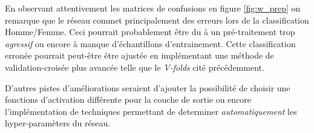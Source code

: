 \documentclass[11pt]{article}
\begin{document}
En observant attentivement les matrices de
confusions en figure \ref{fig:w_prep} on remarque que le r\'eseau commet
principalement des erreurs lors de la classification Homme/Femme. Ceci pourrait
probablement \^etre du \`a un pr\'e-traitement trop {\em agressif} ou encore \`a
manque d'\'echantillons d'entrainement. Cette classification erron\'ee pourrait
peut-\^etre \^etre ajust\'ee en impl\'ementant une m\'ethode de
validation-crois\'ee plus avanc\'ee telle que le {\em V-folds} cit\'e pr\'ec\'edemment.

D'autres pistes d'am\'eliorations seraient d'ajouter la possibilit\'e de choisir une
fonctions d'activation diff\'erente pour la couche de sortie ou encore
l'impl\'ementation de techniques permettant de determiner {\em automatiquement}
les hyper-param\`eters du r\'eseau.


\newpage
\appendix
\end{document}
